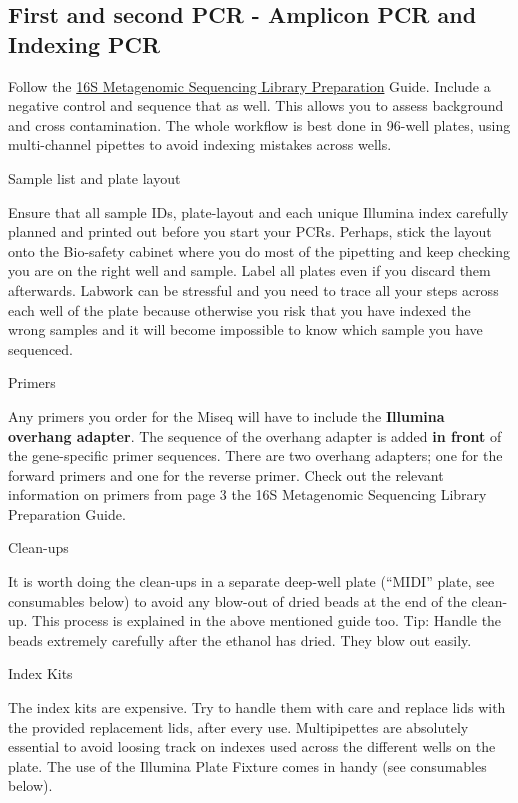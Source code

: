 \documentclass[
]{book}
\begin{document}
\hypertarget{first-and-second-pcr---amplicon-pcr-and-indexing-pcr}{%
\subsection{First and second PCR - Amplicon PCR and Indexing PCR}\label{first-and-second-pcr---amplicon-pcr-and-indexing-pcr}}

Follow the \href{https://sapac.support.illumina.com/content/dam/illumina-support/documents/documentation/chemistry_documentation/16s/16s-metagenomic-library-prep-guide-15044223-b.pdf}{16S Metagenomic Sequencing Library
Preparation} Guide. Include a negative control and sequence that as well. This allows you to assess background and cross contamination. The whole workflow is best done in 96-well plates, using multi-channel pipettes to avoid indexing mistakes across wells.

Sample list and plate layout

Ensure that all sample IDs, plate-layout and each unique Illumina index carefully planned and printed out before you start your PCRs. Perhaps, stick the layout onto the Bio-safety cabinet where you do most of the pipetting and keep checking you are on the right well and sample. Label all plates even if you discard them afterwards. Labwork can be stressful and you need to trace all your steps across each well of the plate because otherwise you risk that you have indexed the wrong samples and it will become impossible to know which sample you have sequenced.

Primers

Any primers you order for the Miseq will have to include the \textbf{Illumina overhang adapter}. The sequence of the overhang adapter is added \textbf{in front} of the gene-specific primer sequences. There are two overhang adapters; one for the forward primers and one for the reverse primer. Check out the relevant information on primers from page 3 the 16S Metagenomic Sequencing Library Preparation Guide.

Clean-ups

It is worth doing the clean-ups in a separate deep-well plate (``MIDI'' plate, see consumables below) to avoid any blow-out of dried beads at the end of the clean-up. This process is explained in the above mentioned guide too. Tip: Handle the beads extremely carefully after the ethanol has dried. They blow out easily.

Index Kits

The index kits are expensive. Try to handle them with care and replace lids with the provided replacement lids, after every use. Multipipettes are absolutely essential to avoid loosing track on indexes used across the different wells on the plate. The use of the Illumina Plate Fixture comes in handy (see consumables below).
\end{document}
